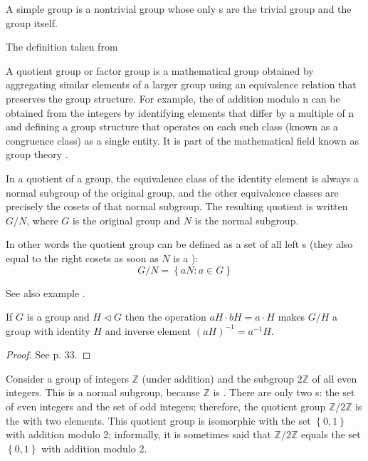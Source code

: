 \begin{appendices}
\begin{definition}
   A simple group is a nontrivial group whose only
   s are the trivial group and the group
   itself.

   The definition taken from \cite{wiki:simplegroup}
   \label{def:simplegroup}
\end{definition}

\begin{definition}
  A quotient group or factor group is a mathematical group obtained by
  aggregating similar elements of a larger group using an equivalence
  relation that preserves the group structure. For example, the
   of addition modulo n can be obtained from
  the integers by 
  identifying elements that differ by a multiple of n and defining a
  group structure that operates on each such class (known as a
  congruence class) as a single entity. It is part of the mathematical
  field known as group theory \cite{wiki:quotientgroup}. 

  In a quotient of a group, the equivalence class of the identity
  element is always a normal subgroup of the original group, and the
  other equivalence classes are precisely the cosets of that normal
  subgroup. The resulting quotient is written $G / N$, where $G$ is the
  original group and $N$ is the normal subgroup.

  In other words the quotient group can be defined as a set of all
  left s (they also equal to the right cosets as
  soon as $N$ is a ):
  \[
  G/N = \left\{a N: a \in G\right\}
  \]

  See also example .
  \label{def:quotientgroup}
\end{definition}

\begin{theorem}
  If $G$ is a group and $H \triangleleft G$ then the operation $aH
  \cdot bH = a \cdot H$ makes $G/H$ a group with identity $H$ and
  inverse element $\left(a H\right)^{-1} = a^{-1} H$.
  \begin{proof}
    See \cite{book:kostrikin} p. 33.
  \end{proof}
  \label{thm:quotientgroup}
\end{theorem}

\begin{example}
  Consider \cite{wiki:quotientgroup} a group of integers $\mathbb{Z}$
  (under addition) and the 
  subgroup $2\mathbb{Z}$ of all even integers. This is a normal
  subgroup, because $\mathbb{Z}$ is . There
  are only two s: the set 
  of even integers and the set of odd integers; therefore, the
  quotient group $\mathbb{Z}/2\mathbb{Z}$ is the
   with two 
  elements. This 
  quotient group is isomorphic with the set $\left\{ 0, 1 \right\}$
  with addition modulo 2; informally, it is sometimes said that
  $\mathbb{Z}/2\mathbb{Z}$
  equals the set $\left\{ 0, 1 \right\}$ with addition modulo 2.


\end{example}
\end{appendices}
